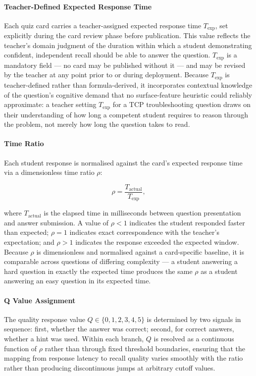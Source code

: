 \paragraph{Teacher-Defined Expected Response Time}
Each quiz card carries a teacher-assigned expected response time $T_{\text{exp}}$, set explicitly during the card review phase before publication. This value reflects the teacher's domain judgment of the duration within which a student demonstrating confident, independent recall should be able to answer the question. $T_{\text{exp}}$ is a mandatory field — no card may be published without it — and may be revised by the teacher at any point prior to or during deployment. Because $T_{\text{exp}}$ is teacher-defined rather than formula-derived, it incorporates contextual knowledge of the question's cognitive demand that no surface-feature heuristic could reliably approximate: a teacher setting $T_{\text{exp}}$ for a TCP troubleshooting question draws on their understanding of how long a competent student requires to reason through the problem, not merely how long the question takes to read.

\paragraph{Time Ratio}
Each student response is normalised against the card's expected response time via a dimensionless time ratio $\rho$:

\begin{equation}
    \rho = \frac{T_{\text{actual}}}{T_{\text{exp}}},
\end{equation}



where $T_{\text{actual}}$ is the elapsed time in milliseconds between question presentation and answer submission. A value of $\rho < 1$ indicates the student responded faster than expected; $\rho = 1$ indicates exact correspondence with the teacher's expectation; and $\rho > 1$ indicates the response exceeded the expected window. Because $\rho$ is dimensionless and normalised against a card-specific baseline, it is comparable across questions of differing complexity — a student answering a hard question in exactly the expected time produces the same $\rho$ as a student answering an easy question in its expected time.

\paragraph{Q Value Assignment}
The quality response value $Q \in \{0, 1, 2, 3, 4, 5\}$ is determined by two signals in sequence: first, whether the answer was correct; second, for correct answers, whether a hint was used. Within each branch, $Q$ is resolved as a continuous function of $\rho$ rather than through fixed threshold boundaries, ensuring that the mapping from response latency to recall quality varies smoothly with the ratio rather than producing discontinuous jumps at arbitrary cutoff values.

